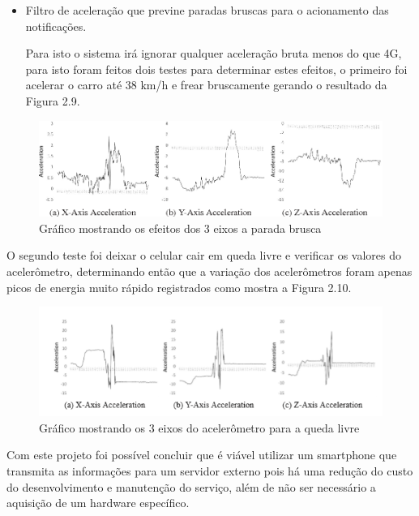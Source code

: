 \begin{itemize}
    \item  Filtro de aceleração que previne paradas bruscas para o acionamento das notificações.
    
    Para isto o sistema irá ignorar qualquer aceleração bruta menos do que 4G, para isto foram feitos dois testes para determinar estes efeitos, o primeiro foi acelerar o carro até 38 km/h e frear bruscamente gerando o resultado da Figura 2.9.
    
\end{itemize}


\begin{figure}[H]

 \caption{Gráfico mostrando os efeitos dos 3 eixos a parada brusca}
  \includegraphics[width=150mm]{images/Cap2/acelerometro_graficos.png}
  
    
\end{figure}


O segundo teste foi deixar o celular cair em queda livre e verificar os valores do acelerômetro, determinando então que a variação dos acelerômetros foram apenas picos de energia muito rápido registrados como mostra a Figura 2.10.



\begin{figure}[H]

 \caption{Gráfico mostrando os 3 eixos do acelerômetro para a queda livre}
  \includegraphics[width=150mm]{images/Cap2/acelerometro_quedalivre.png}
  \end{figure}
Com este projeto foi possível concluir que é viável utilizar um smartphone que transmita as informações para um servidor externo pois há uma redução do custo do desenvolvimento e manutenção do serviço, além de não ser necessário a aquisição de um hardware específico.
